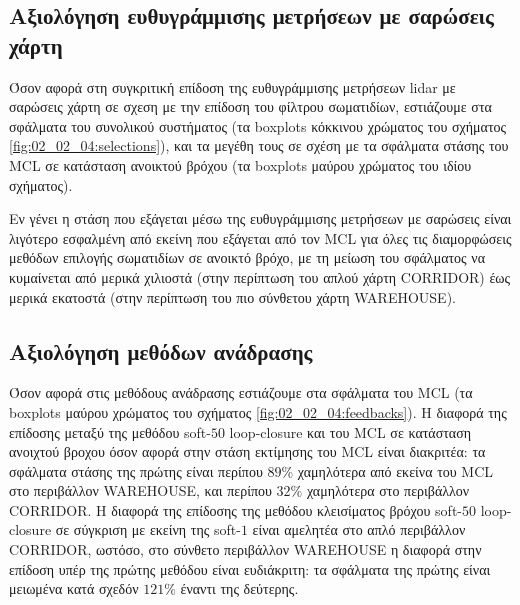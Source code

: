\subsection{Αξιολόγηση ευθυγράμμισης μετρήσεων με σαρώσεις χάρτη}

Όσον αφορά στη συγκριτική επίδοση της ευθυγράμμισης μετρήσεων lidar με σαρώσεις
χάρτη σε σχεση με την επίδοση του φίλτρου σωματιδίων, εστιάζουμε στα σφάλματα
του συνολικού συστήματος (τα boxplots κόκκινου χρώματος του σχήματος
\ref{fig:02_02_04:selections}), και τα μεγέθη τους σε σχέση με τα σφάλματα
στάσης του MCL σε κατάσταση ανοικτού βρόχου (τα boxplots μαύρου χρώματος του
ιδίου σχήματος).

Εν γένει η στάση που εξάγεται μέσω της ευθυγράμμισης μετρήσεων με σαρώσεις
είναι λιγότερο εσφαλμένη από εκείνη που εξάγεται από τον MCL για όλες τις
διαμορφώσεις μεθόδων επιλογής σωματιδίων σε ανοικτό βρόχο, με τη μείωση του
σφάλματος να κυμαίνεται από μερικά χιλιοστά (στην περίπτωση του απλού χάρτη
CORRIDOR) έως μερικά εκατοστά (στην περίπτωση του πιο σύνθετου χάρτη
WAREHOUSE).

\subsection{Αξιολόγηση μεθόδων ανάδρασης}

Όσον αφορά στις μεθόδους ανάδρασης εστιάζουμε στα σφάλματα του MCL (τα
boxplots μαύρου χρώματος του σχήματος \ref{fig:02_02_04:feedbacks}). Η διαφορά
της επίδοσης μεταξύ της μεθόδου soft-$50$ loop-closure και του MCL σε κατάσταση
ανοιχτού βροχου όσον αφορά στην στάση εκτίμησης του MCL είναι διακριτέα: τα
σφάλματα στάσης της πρώτης είναι περίπου $89\%$ χαμηλότερα από εκείνα του MCL
στο περιβάλλον WAREHOUSE, και περίπου $32\%$ χαμηλότερα στο περιβάλλον
CORRIDOR. Η διαφορά της επίδοσης της μεθόδου κλεισίματος βρόχου soft-$50$
loop-closure σε σύγκριση με εκείνη της soft-$1$ είναι αμελητέα στο απλό
περιβάλλον CORRIDOR, ωστόσο, στο σύνθετο περιβάλλον WAREHOUSE η διαφορά στην
επίδοση υπέρ της πρώτης μεθόδου είναι ευδιάκριτη: τα σφάλματα της πρώτης είναι
μειωμένα κατά σχεδόν $121\%$ έναντι της δεύτερης.

